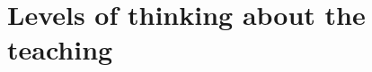 \documentclass{article}
\begin{document}
%
%
%






\section{Levels of thinking about the teaching}
\end{document}
